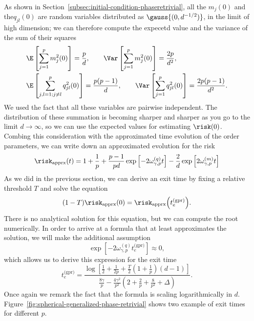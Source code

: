 As shown in Section~\ref{subsec:initial-condition-phaseretrivial}, all the \(m_j{(0)}\) and the\(q_{jl}{(0)}\) 
are random variables distributed as \(\gauss{(0,d^{-1/2})}\), in the limit of high dimension;
we can therefore compute the expecetd value and the variance of the sum of their squares
\[\begin{split}
 &\E\left[\sum_{j=1}^p m_j^2{(0)}\right] = \frac{p}{d}, \qquad
  \Var\left[\sum_{j=1}^p m_j^2{(0)}\right] = \frac{2p}{d^2}, \\
 &\E\left[\sum_{j,l=1;j\neq l}^p q_{jl}^2{(0)}\right] = \frac{p(p-1)}{d}, \qquad
  \Var\left[\sum_{j=1}^p q_{jl}^2{(0)}\right] = \frac{2p(p-1)}{d^2}. \\
\end{split}\]
We used the fact that all these variables are pairwise independent.
The distribution of these summation is becoming sharper and sharper as you go to the limit \(d\to\infty\),
so we can use the expected values for estimating \(\risk(0)\).
Combing this consideration with the approximated time evolution of the order parameters,
we can write down an approximated evolution for the risk
\[
  \risk_\text{apprx}{(t)} = 1 + \frac1p + \frac{p-1}{pd}\exp{\left[-2\omega^{(q)}_{\gamma,p} t\right]} - \frac2d \exp{\left[2\omega^{(m)}_{\gamma,p} t\right]}
\]
As we did in the previous section, we can derive an exit time by fixing a relative threshold \(T\)
and solve the equation 
\begin{equation}\label{eq:exit_time_equation}
  (1-T)\risk_\text{apprx}{(0)} = \risk_\text{apprx}{\left(t^\text{(gpr)}_e\right)}.
\end{equation}
There is no analytical solution for this equation, but we can compute the root numerically.
In order to arrive at a formula that at least approximates the solution, we will make the additional assumption 
\[
  \exp{\left[-2\omega^{(q)}_{\gamma,p} t^\text{(gpr)}_e\right]}  \approx 0,
\]
which allows us to derive this expression for the exit time
\[
  t^\text{(gpr)}_e = \frac{\log\left[\frac12+\frac{1}{2p}+\frac{T}{2}\left(1+\frac{1}{p}\right)(d-1)\right]}{\frac{8 \gamma}{p} -\frac{4 \gamma^2}{p^2} \left(2 +\frac{2}{p} + \frac{8}{p^2} + \Delta \right)}.
\]
Once again we remark the fact that the formula is scaling logarithmically in \(d\).
Figure~\ref{fig:spherical-generalized-phase-retrivial} shows two example of exit times for different \(p\).

